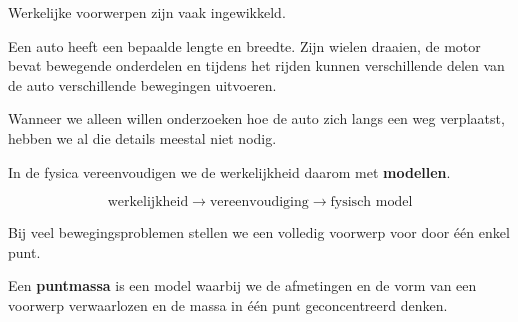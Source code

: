 \documentclass{ximera}
\begin{document}


Werkelijke voorwerpen zijn vaak ingewikkeld.

Een auto heeft een bepaalde lengte en breedte. Zijn wielen draaien,
de motor bevat bewegende onderdelen en tijdens het rijden kunnen
verschillende delen van de auto verschillende bewegingen uitvoeren.

Wanneer we alleen willen onderzoeken hoe de auto zich langs een weg
verplaatst, hebben we al die details meestal niet nodig.

In de fysica vereenvoudigen we de werkelijkheid daarom met
\textbf{modellen}.

\[
\boxed{
\text{werkelijkheid}
\longrightarrow
\text{vereenvoudiging}
\longrightarrow
\text{fysisch model}
}
\]



Bij veel bewegingsproblemen stellen we een volledig voorwerp voor
door één enkel punt.

\begin{definitie}[Puntmassa]

Een \textbf{puntmassa} is een model waarbij we de afmetingen en de
vorm van een voorwerp verwaarlozen en de massa in één punt
geconcentreerd denken.

\end{definitie}
\end{document}
